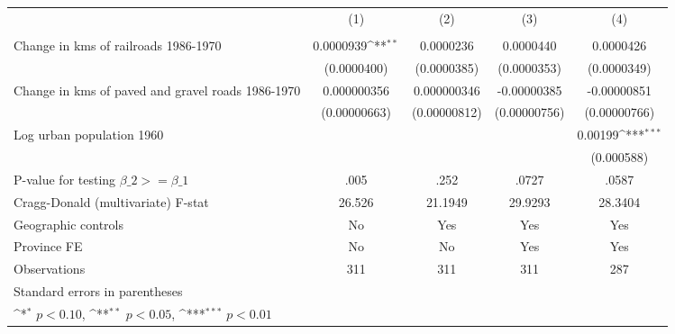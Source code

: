 {
\def\sym#1{\ifmmode^{#1}\else\(^{#1}\)\fi}
\begin{tabular}{l*{4}{c}}
\hline\hline
                &\multicolumn{1}{c}{(1)}&\multicolumn{1}{c}{(2)}&\multicolumn{1}{c}{(3)}&\multicolumn{1}{c}{(4)}\\
                &\multicolumn{1}{c}{}&\multicolumn{1}{c}{}&\multicolumn{1}{c}{}&\multicolumn{1}{c}{}\\
\hline
Change in kms of railroads 1986-1970&0.0000939\sym{**} &0.0000236         &0.0000440         &0.0000426         \\
                &(0.0000400)         &(0.0000385)         &(0.0000353)         &(0.0000349)         \\
[1em]
Change in kms of paved and gravel roads 1986-1970&0.000000356         &0.000000346         &-0.00000385         &-0.00000851         \\
                &(0.00000663)         &(0.00000812)         &(0.00000756)         &(0.00000766)         \\
[1em]
Log urban population 1960&                  &                  &                  &  0.00199\sym{***}\\
                &                  &                  &                  &(0.000588)         \\
\hline
P-value for testing $\beta\_{2} >= \beta\_{1}$&     .005         &     .252         &    .0727         &    .0587         \\
Cragg-Donald (multivariate) F-stat&   26.526         &  21.1949         &  29.9293         &  28.3404         \\
Geographic controls&       No         &      Yes         &      Yes         &      Yes         \\
Province FE     &       No         &       No         &      Yes         &      Yes         \\
Observations    &      311         &      311         &      311         &      287         \\
\hline\hline
\multicolumn{5}{l}{\footnotesize Standard errors in parentheses}\\
\multicolumn{5}{l}{\footnotesize \sym{*} \(p<0.10\), \sym{**} \(p<0.05\), \sym{***} \(p<0.01\)}\\
\end{tabular}
}
